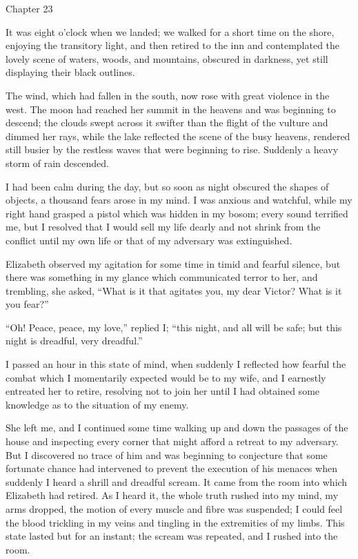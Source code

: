 \documentclass[12pt,openright]{book}
\begin{document}
Chapter 23

It was eight o’clock when we landed; we walked for a short time on the shore, enjoying the transitory light, and then retired to the inn and contemplated the lovely scene of waters, woods, and mountains, obscured in darkness, yet still displaying their black outlines.

The wind, which had fallen in the south, now rose with great violence in the west. The moon had reached her summit in the heavens and was beginning to descend; the clouds swept across it swifter than the flight of the vulture and dimmed her rays, while the lake reflected the scene of the busy heavens, rendered still busier by the restless waves that were beginning to rise. Suddenly a heavy storm of rain descended.

I had been calm during the day, but so soon as night obscured the shapes of objects, a thousand fears arose in my mind. I was anxious and watchful, while my right hand grasped a pistol which was hidden in my bosom; every sound terrified me, but I resolved that I would sell my life dearly and not shrink from the conflict until my own life or that of my adversary was extinguished.

Elizabeth observed my agitation for some time in timid and fearful silence, but there was something in my glance which communicated terror to her, and trembling, she asked, “What is it that agitates you, my dear Victor? What is it you fear?”

“Oh! Peace, peace, my love,” replied I; “this night, and all will be safe; but this night is dreadful, very dreadful.”

I passed an hour in this state of mind, when suddenly I reflected how fearful the combat which I momentarily expected would be to my wife, and I earnestly entreated her to retire, resolving not to join her until I had obtained some knowledge as to the situation of my enemy.

She left me, and I continued some time walking up and down the passages of the house and inspecting every corner that might afford a retreat to my adversary. But I discovered no trace of him and was beginning to conjecture that some fortunate chance had intervened to prevent the execution of his menaces when suddenly I heard a shrill and dreadful scream. It came from the room into which Elizabeth had retired. As I heard it, the whole truth rushed into my mind, my arms dropped, the motion of every muscle and fibre was suspended; I could feel the blood trickling in my veins and tingling in the extremities of my limbs. This state lasted but for an instant; the scream was repeated, and I rushed into the room.
\end{document}
